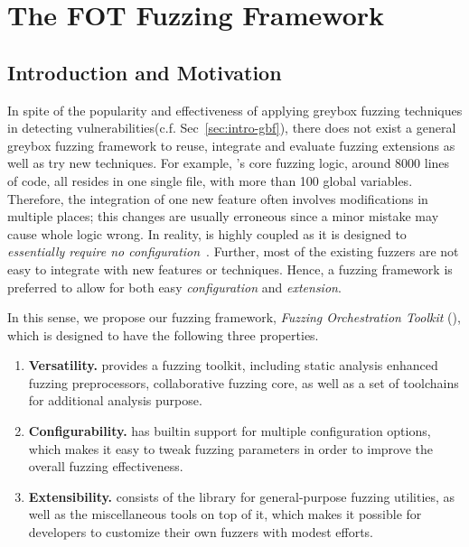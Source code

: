 
\chapter{The FOT Fuzzing Framework} \label{ch:fot}


\section{Introduction and Motivation}


In spite of the popularity and effectiveness of applying greybox fuzzing techniques in detecting vulnerabilities(c.f. Sec~\ref{sec:intro-gbf}), there does not exist a general greybox fuzzing framework to reuse, integrate and evaluate fuzzing extensions as well as try new techniques.
For example, {\AFL}'s core fuzzing logic, around 8000 lines of code, all resides in one single file, with more than 100 global variables. Therefore, the integration of one new feature often involves modifications in multiple places; this changes are usually erroneous since a minor mistake may cause whole logic wrong.
In reality, {\AFL} is highly coupled as it is designed to \textit{essentially require no configuration}~\cite{afl}.
Further, most of the existing fuzzers are not easy to integrate with new features or techniques.
Hence, a fuzzing framework is preferred to allow for both easy \emph{configuration} and \emph{extension}.


In this sense, we propose our fuzzing framework, \emph{Fuzzing Orchestration Toolkit} ({\FOT}), which is designed to have the following three properties.

\begin{enumerate}[(1)]

\item  \textbf{Versatility.}
{\FOT} provides a fuzzing toolkit, including static analysis enhanced fuzzing preprocessors, collaborative fuzzing core, as well as a set of toolchains for additional analysis purpose.
\item \textbf{Configurability.}
{\FOT} has builtin support for multiple configuration options, which makes it easy to tweak fuzzing parameters in order to improve the overall fuzzing effectiveness.
\item \textbf{Extensibility.}
{\FOT} consists of the library for general-purpose fuzzing utilities, as well as the miscellaneous tools on top of it, which makes it possible for developers to customize their own fuzzers with modest efforts.
\end{enumerate}


